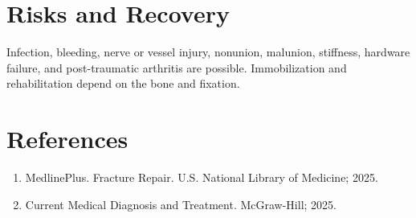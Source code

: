 \section*{Risks and Recovery}
Infection, bleeding, nerve or vessel injury, nonunion, malunion, stiffness, hardware failure, and post-traumatic arthritis are possible. Immobilization and rehabilitation depend on the bone and fixation.
\section*{References}
\begin{enumerate}\item MedlinePlus. Fracture Repair. U.S. National Library of Medicine; 2025.\item Current Medical Diagnosis and Treatment. McGraw-Hill; 2025.\end{enumerate}
\clearpage
